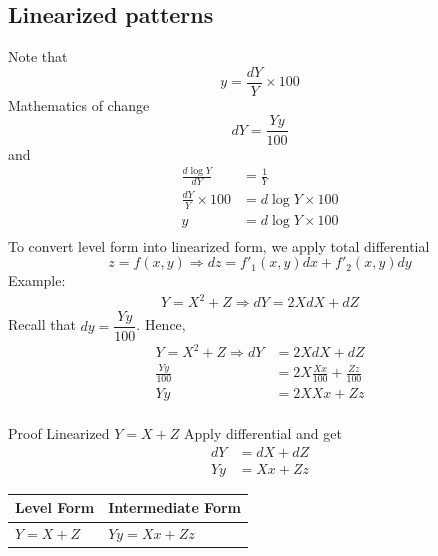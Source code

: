\documentclass{article}
\begin{document}
\subsection{Linearized patterns}
Note that
\begin{equation}
    y=\frac{dY}{Y}\times100
\end{equation}
Mathematics of change
\begin{equation}
    dY=\frac{Yy}{100}
\end{equation}
and
\begin{align}
    \frac{d\log Y}{dY} &= \frac{1}{Y} \\
    \frac{dY}{Y}\times 100 &= d\log Y\times100 \\
    y &= d\log Y\times100 \\
\end{align}
To convert level form into linearized form, we apply total differential
\begin{equation}
    z=f(x,y) \Longrightarrow dz= f'_1(x,y)dx+f'_2(x,y)dy
\end{equation}
Example:
\begin{align}
    Y = X^2+Z \Longrightarrow dY=2XdX+dZ
\end{align}
Recall that $dy = \dfrac{Yy}{100}$. Hence,
\begin{align}
    Y = X^2+Z \Longrightarrow dY &= 2XdX+dZ \\
    \frac{Yy}{100} &= 2X\frac{Xx}{100} + \frac{Zz}{100} \\
    Yy &= 2XXx + Zz \\
\end{align}

Proof
Linearized $Y=X+Z$
Apply differential and get
\begin{align}
    dY &= dX + dZ \\
    Yy &= Xx + Zz 
\end{align}

\begin{tabular}{ll}
    \toprule
    \textbf{Level Form} & \textbf{Intermediate Form}
    \\
    \midrule
    $Y = X+Z$ & $Yy = Xx + Zz$ & \\
    \bottomrule
\end{tabular}
\end{document}
